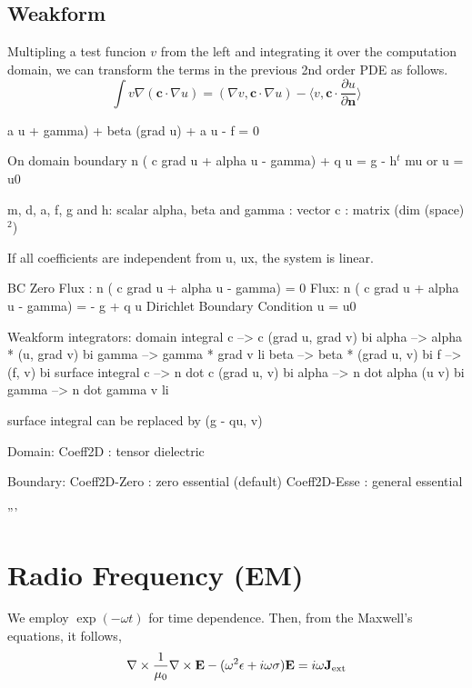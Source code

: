 \documentclass[11pt,a4paper,draft]{report}
\begin{document}
 \subsection{Weakform}
  Multipling a test funcion $v$ from the left and integrating it over the computation domain,  we can transform the terms in the previous 2nd order PDE as follows.
  \begin{equation}
 \int v \nabla (\mathbf{c} \cdot \nabla u) = (\nabla v,\mathbf{c} \cdot \nabla u) - \langle v, \mathbf{c} \cdot \frac{\partial u}{\partial \mathbf{n}} \rangle
  \end{equation}
  
  a u + gamma) 
              + beta (grad u) + a u - f = 0

  On domain boundary
     n ( c grad u + alpha u - gamma) + q u = g - h$^t$ mu
       or 
     u = u0  

    m, d, a, f, g and h: scalar
    alpha, beta and gamma : vector
    c  : matrix (dim (space) $^2$)

    If all coefficients are independent from u, ux,
    the system is linear.

    BC
     Zero Flux : 
        n ( c grad u + alpha u - gamma) = 0
     Flux: 
        n ( c grad u + alpha u - gamma) = - g + q u
     Dirichlet Boundary Condition
        u = u0

  Weakform integrators:
    domain integral
       c     -->  c (grad u, grad v)     bi
       alpha -->  alpha * (u, grad v)    bi
       gamma -->  gamma * grad v         li
       beta  -->  beta * (grad u, v)     bi
       f     -->  (f, v)                 bi
    surface integral
       c     -->   n dot c (grad u, v)   bi
       alpha -->   n dot alpha  (u v)    bi
       gamma -->   n dot gamma   v       li
 
    surface integral can be replaced by (g - qu, v)
        
  Domain:   
     Coeff2D          : tensor dielectric

  Boundary:
     Coeff2D-Zero     : zero essential (default)
     Coeff2D-Esse     : general essential

'''
\section{Radio Frequency (EM)}

We employ $\exp{(-\omega t)}$ for time dependence. Then, from the Maxwell's equations, it follows,
\begin{equation}
\nabla \times \frac{1}{\mu_0} \nabla \times \mathbf{E} - (\omega^2 \epsilon + i \omega \sigma) \mathbf{E} = i \omega \mathbf{J}_{\rm ext}
\end{equation}
\end{document}
